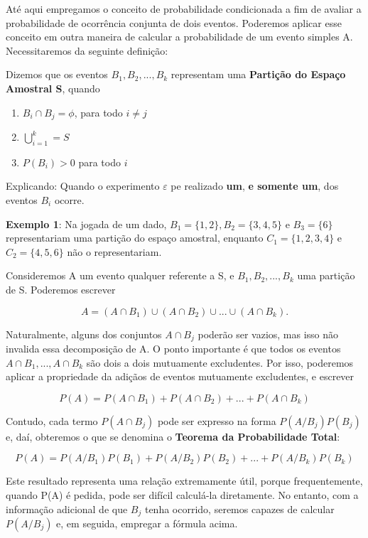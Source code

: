 Até aqui empregamos o conceito de probabilidade condicionada a fim
de avaliar a probabilidade de ocorrência conjunta de dois eventos.
Poderemos aplicar esse conceito em outra maneira de calcular a
probabilidade de um evento simples A. Necessitaremos da seguinte
definição:\vskip0.3cm


Dizemos que os eventos $B_{1},B_{2},...,B_{k}$ representam uma
\textbf{Partição do Espaço Amostral S}, quando


\begin{enumerate}
    \item $B_{i} \cap B_{j}=\phi$, para todo $i\neq j$
    \item $\bigcup^{k}_{i=1}=S$
    \item $P(B_{i})>0$ para todo $i$
\end{enumerate}

Explicando: Quando o experimento $\varepsilon$ pe realizado
\textbf{um}, \textbf{e somente um}, dos eventos $B_{i}$
ocorre.\vskip0.3cm

\textbf{Exemplo 1}: Na jogada de um dado,
$B_{1}=\{1,2\},B_{2}=\{3,4,5 \}$ e $B_{3}=\{6\}$ representariam
uma partição do espaço amostral, enquanto $C_{1}=\{1,2,3,4\}$ e
$C_{2}=\{4,5,6 \}$ não o representariam.\vskip0.3cm

Consideremos A um evento qualquer referente a S, e
$B_{1},B_{2},...,B_{k}$ uma partição de S. Poderemos escrever

$$
A = (A \cap B_{1}) \cup (A \cap B_{2}) \cup ... \cup (A \cap
B_{k}).
$$

Naturalmente, alguns dos conjuntos $A \cap B_{j}$ poderão ser
vazios, mas isso não invalida essa decomposição de A. O ponto
importante é que todos os eventos $A \cap B_{1},...,A \cap B_{k}$
são dois a dois mutuamente excludentes. Por isso, poderemos
aplicar a propriedade da adiçãos de eventos mutuamente
excludentes, e escrever


$$
P(A)=P(A\cap B_{1})+P(A\cap B_{2})+...+P(A\cap B_{k})
$$

Contudo, cada termo $P(A\cap B_{j})$ pode ser expresso na forma
$P(A/B_{j})P(B_{j})$ e, daí, obteremos o que se denomina o
\textbf{Teorema da Probabilidade Total}:

\begin{equation}\label{}
P(A)=P(A/B_{1})P(B_{1})+P(A/B_{2})P(B_{2})+...+P(A/B_{k})P(B_{k})
\end{equation}

Este resultado representa uma relação extremamente útil, porque
frequentemente, quando P(A) é pedida, pode ser difícil calculá-la
diretamente. No entanto, com a informação adicional de que $B_{j}$
tenha ocorrido, seremos capazes de calcular $P(A/B_{j})$ e, em
seguida, empregar a fórmula acima.


